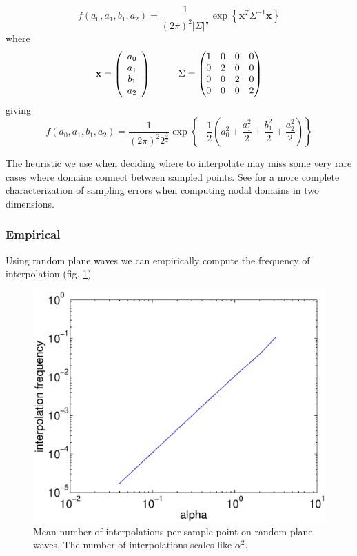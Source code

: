 \documentclass{report}
\newcommand{\xx}[0]{\mathbf{x}}
\begin{document}
\[
f(a_{0}, a_{1}, b_{1}, a_{2}) = \frac{1}{(2 \pi)^{2} {\vert \Sigma \vert}^{\frac{1}{2}}} \exp{\left\{ \xx^{T} \Sigma^{-1} \xx \right\}}
\]
where
\[
\xx = \left(
\begin{array}{c}
  a_{0} \\
  a_{1} \\
  b_{1} \\
  a_{2}
\end{array}
\right)
\hspace{1 cm}
\Sigma = \begin{pmatrix}
  1 & 0 & 0 & 0 \\
  0 & 2 & 0 & 0 \\
  0 & 0 & 2 & 0 \\
  0 & 0 & 0 & 2
\end{pmatrix}
\]
giving
\[
f(a_{0}, a_{1}, b_{1}, a_{2}) = \frac{1}{(2 \pi)^{2} 2^{\frac{3}{2}}} \exp{\left\{ -\frac{1}{2} \left( a_{0}^{2} + \frac{a_{1}^{2}}{2} + \frac{b_{1}^{2}}{2} + \frac{a_{2}^{2}}{2} \right) \right\}}
\]


The heuristic we use when deciding where to interpolate may miss some very rare cases where domains connect between sampled points. See \cite{mischaikow} for a more complete characterization of sampling errors when computing nodal domains in two dimensions.

\subsubsection{Empirical}
Using random plane waves we can empirically compute the frequency of interpolation (fig. \ref{fig:rpw_interp_freq})
\begin{figure}
  \begin{center}
    \includegraphics[width=\textwidth]{figs/interpolation/rpw_interp_frequencies.eps}
    \caption{Mean number of interpolations per sample point on random plane waves. The number of interpolations scales like $\alpha^{2}$.}
    \label{fig:rpw_interp_freq}
  \end{center}
\end{figure}
\end{document}
